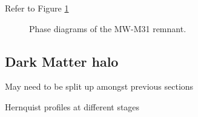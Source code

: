 \documentclass[twocolumn]{aastex63}
\newcommand{\todo}{\color{red}{TODO}\color{black}\hspace{2mm}}
\begin{document}
Refer to Figure \ref{fig:rem_phase}

\begin{figure}[htb!]
	\caption{Phase diagrams of the MW-M31 remnant.
	\label{fig:rem_phase}}
\end{figure}

\todo{alignment between particles of different origin?}

\subsection{Dark Matter halo}

May need to be split up amongst previous sections

\todo{what happens during close approach? merger? remanant?}

Hernquist profiles at different stages


{}

\end{document}
